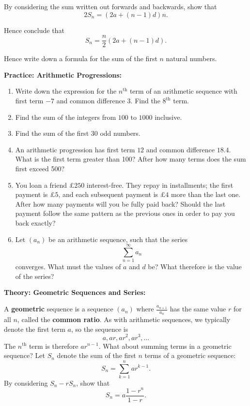 \documentclass{article}
\begin{document}
By considering the sum written out forwards and backwards, show that
\[2S_n = (2a+(n-1)d)n.\]

\vfill

Hence conclude that
\[S_n=\frac{n}{2}(2a+(n-1)d).\]

\vfill

Hence write down a formula for the sum of the first $n$ natural numbers.




\clearpage




\textbf{Practice: Arithmetic Progressions:}\bigskip


\begin{enumerate}
	\item Write down the expression for the $n^\mathrm{th}$ term of an arithmetic sequence with first term $-7$ and common difference $3$. Find the $8^\mathrm{th}$ term.
	\item Find the sum of the integers from $100$ to $1000$ inclusive.
	\item Find the sum of the first 30 odd numbers.
	\item An arithmetic progression has first term $12$ and common difference $18.4$. What is the first term greater than 100? After how many terms does the sum first exceed 500?
	\item You loan a friend $\pounds 250$ interest-free. They repay in installments; the first payment is $\pounds 5$, and each subsequent payment is $\pounds 4$ more than the last one. After how many payments will you be fully paid back? Should the last payment follow the same pattern as the previous ones in order to pay you back exactly?
	\item Let $(a_n)$ be an arithmetic sequence, such that the series
		\[\sum_{n=1}^\infty a_n\]
		converges. What must the values of $a$ and $d$ be? What therefore is the value of the series?
\end{enumerate}



\clearpage



\textbf{Theory: Geometric Sequences and Series:}\bigskip


A \textbf{geometric} sequence is a sequence $(a_n)$ where $\frac{a_{n+1}}{a_n}$ has the same value $r$ for all $n$, called the \textbf{common ratio}. As with arithmetic sequences, we typically denote the first term $a$, so the sequence is
\[a, ar, ar^2, ar^3,\hdots\]
The $n^\mathrm{th}$ term is therefore $ar^{n-1}$. What about summing terms in a geometric sequence? Let $S_n$ denote the sum of the first $n$ terms of a geometric sequence:
\[S_n = \sum_{k=1}^n ar^{k-1}.\]
By considering $S_n-rS_n$, show that
\[S_n = a\frac{1-r^{n}}{1-r}.\]
\end{document}
